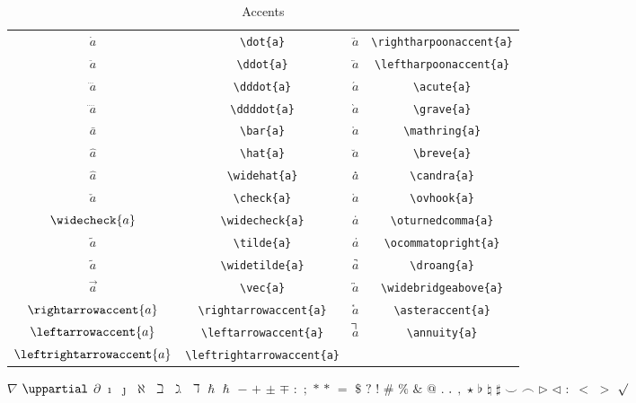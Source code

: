 \documentclass[captions=tableheading]{scrartcl}
\begin{document}
\begin{table}
  \caption{Accents}
  \label{tab:accents}
  \centering
  \begin{tabular}[c]{cc@{\hskip 3em}cc}
    \toprule
    $\dot{a}$ & \verb|\dot{a}| &
    $\rightharpoonaccent{a}$ & \verb|\rightharpoonaccent{a}| \\
    $\ddot{a}$ & \verb|\ddot{a}| &
    $\leftharpoonaccent{a}$ & \verb|\leftharpoonaccent{a}| \\
    $\dddot{a}$ & \verb|\dddot{a}| &
    $\acute{a}$ & \verb|\acute{a}| \\
    $\ddddot{a}$ & \verb|\ddddot{a}| &
    $\grave{a}$ & \verb|\grave{a}| \\
    $\bar{a}$ & \verb|\bar{a}| &
    $\mathring{a}$ & \verb|\mathring{a}| \\
    \addlinespace
    $\hat{a}$ & \verb|\hat{a}| &
    $\breve{a}$ & \verb|\breve{a}| \\
    $\widehat{a}$ & \verb|\widehat{a}| &
    $\candra{a}$ & \verb|\candra{a}| \\
    $\check{a}$ & \verb|\check{a}| &
    $\ovhook{a}$ & \verb|\ovhook{a}| \\
    $\widecheck{a}$ & \verb|\widecheck{a}| &
    $\oturnedcomma{a}$ & \verb|\oturnedcomma{a}| \\
    $\tilde{a}$ & \verb|\tilde{a}| &
    $\ocommatopright{a}$ & \verb|\ocommatopright{a}| \\
    $\widetilde{a}$ & \verb|\widetilde{a}| &
    $\droang{a}$ & \verb|\droang{a}| \\
    \addlinespace
    $\vec{a}$ & \verb|\vec{a}| &
    $\widebridgeabove{a}$ & \verb|\widebridgeabove{a}| \\
    $\rightarrowaccent{a}$ & \verb|\rightarrowaccent{a}| &
    $\asteraccent{a}$ & \verb|\asteraccent{a}| \\
    $\leftarrowaccent{a}$ & \verb|\leftarrowaccent{a}| &
    $\annuity{a}$ & \verb|\annuity{a}| \\
    $\leftrightarrowaccent{a}$ & \verb|\leftrightarrowaccent{a}| &
    & \\
    \bottomrule
  \end{tabular}
\end{table}

$\nabla$
$\uppartial$
$\partial$
$\imath$
$\jmath$
$\aleph$
$\beth$
$\gimel$
$\daleth$
$\hbar$
$\hslash$
$-$
$+$
$\pm$
$\mp$
$:$
$;$
$*$
$\ast$
$=$
$\mathdollar$
$?$
$!$
$\#$
$\%$
$\&$
$@$
$.$
$\ldotp$
$,$
$\star$
$\flat$
$\natural$
$\sharp$
$\smile$
$\frown$
$\triangleright$
$\triangleleft$
$\colon$
$<$
$>$
$\surd$
\end{document}
